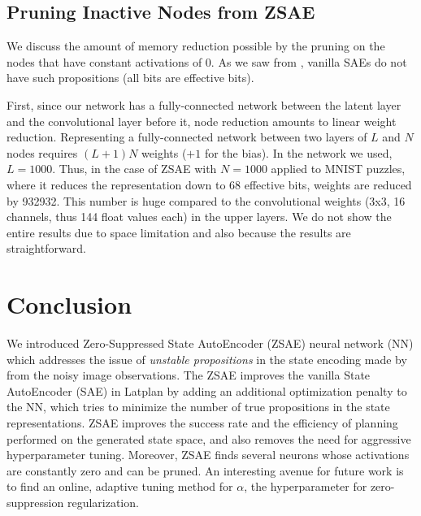 \subsection{Pruning Inactive Nodes from ZSAE}


We discuss the amount of memory reduction possible by the pruning on the nodes
that have constant activations of 0. As we saw from ,
vanilla SAEs do not have such propositions (all bits are effective bits).

First, since our network has a fully-connected network between the
latent layer and the convolutional layer before it, node reduction
amounts to linear weight reduction.  Representing a fully-connected
network between two layers of $L$ and $N$ nodes requires $(L+1)N$
weights ($+1$ for the bias).
In the network we used, $L=1000$. Thus, in the case of ZSAE with $N=1000$ applied to MNIST puzzles,
where it reduces the representation down to 68 effective bits, weights are reduced by 932932.
This number is huge compared to the convolutional weights (3x3, 16 channels, thus 144 float values each) in the upper layers.
We do not show the entire results due to space limitation and also because the results are straightforward.


\section{Conclusion}
\label{conclusion}

We introduced Zero-Suppressed State AutoEncoder (ZSAE) neural network (NN) which addresses
the issue of \emph{unstable propositions} in the state encoding made by
\latentplanner \cite{Asai2018} from the noisy image observations.
% 
The ZSAE improves the vanilla State AutoEncoder (SAE) in Latplan by
adding an additional optimization penalty to the NN,
which tries to minimize the number of true propositions in the state representations.
% 
ZSAE improves the success rate and the efficiency of planning performed on
the generated state space, and also removes the need for aggressive hyperparameter tuning.
% 
Moreover, 
ZSAE finds several neurons whose activations are constantly zero
and can be pruned.
An interesting avenue for future work is to 
find an online, adaptive tuning method for $\alpha$, the hyperparameter for
zero-suppression regularization.

